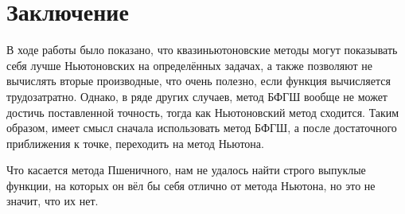 \section{Заключение}
\label{sec:conclusion}
В ходе работы было показано, что квазиньютоновские методы могут показывать себя лучше Ньютоновских на определённых задачах, а также позволяют не вычислять вторые производные, что очень полезно, если функция вычисляется трудозатратно. Однако, в ряде других случаев, метод БФГШ вообще не может достичь поставленной точность, тогда как Ньютоновский метод сходится. Таким образом, имеет смысл сначала использовать метод БФГШ, а после достаточного приближения к точке, переходить на метод Ньютона.

Что касается метода Пшеничного, нам не удалось найти строго выпуклые функции, на которых он вёл бы себя отлично от метода Ньютона, но это не значит, что их нет.
